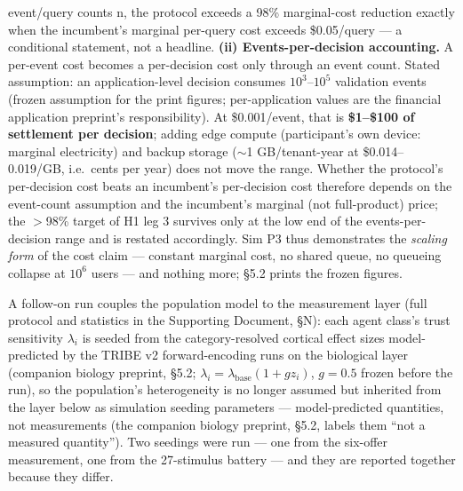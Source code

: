 \documentclass[
]{article}
\begin{document}
\begin{itemize}
  event/query counts n, the protocol exceeds a 98\% marginal-cost
  reduction exactly when the incumbent's marginal per-query cost exceeds
  \$0.05/query --- a conditional statement, not a headline. \textbf{(ii)
  Events-per-decision accounting.} A per-event cost becomes a
  per-decision cost only through an event count. Stated assumption: an
  application-level decision consumes \(10^{3}–10^{5}\) validation
  events (frozen assumption for the print figures; per-application
  values are the financial application preprint's responsibility). At
  \$0.001/event, that is \textbf{\$1--\$100 of settlement per decision};
  adding edge compute (participant's own device: marginal electricity)
  and backup storage (\(\sim\)1 GB/tenant-year at \$0.014--0.019/GB,
  i.e.~cents per year) does not move the range. Whether the protocol's
  per-decision cost beats an incumbent's per-decision cost therefore
  depends on the event-count assumption and the incumbent's marginal
  (not full-product) price; the \(>\)98\% target of H1 leg 3 survives
  only at the low end of the events-per-decision range and is restated
  accordingly. Sim P3 thus demonstrates the \emph{scaling form} of the
  cost claim --- constant marginal cost, no shared queue, no queueing
  collapse at \(10^{6}\) users --- and nothing more; §5.2 prints the
  frozen figures.
\end{itemize}

A follow-on run couples the population model to the measurement layer
(full protocol and statistics in the Supporting Document, §N): each
agent class's trust sensitivity \(\lambda_i\) is seeded from the
category-resolved cortical effect sizes model-predicted by the TRIBE v2
forward-encoding runs on the biological layer (companion biology
preprint, §5.2; \(\lambda_i = \lambda_{\mathrm{base}}(1 + g z_i)\),
\(g = 0.5\) frozen before the run), so the population's heterogeneity is
no longer assumed but inherited from the layer below as simulation
seeding parameters --- model-predicted quantities, not measurements (the
companion biology preprint, §5.2, labels them ``not a measured
quantity''). Two seedings were run --- one from the six-offer
measurement, one from the 27-stimulus battery --- and they are reported
together because they differ.
\end{document}
